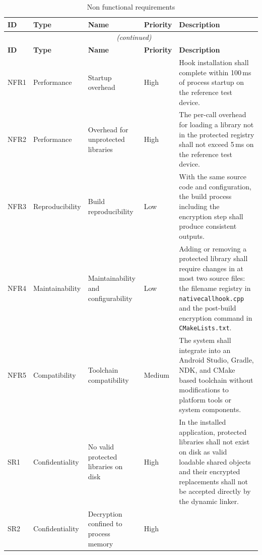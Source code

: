 \documentclass[11pt,a4paper]{report}
\renewcommand\_{{\textunderscore\allowbreak}}
\begin{document}
{%
\begin{longtable}{|p{}|p{}|p{}|p{}|p{}|}
    \caption{Non functional requirements} \label{tab:nonfunctional_requirements} \\
    \hline
    \textbf{ID} & \textbf{Type} & \textbf{Name} & \textbf{Priority} & \textbf{Description} \\
    \hline
    \endfirsthead
    \multicolumn{5}{c}{\tablename\ \thetable{} \textit{(continued)}} \\[0.5ex]
    \hline
    \textbf{ID} & \textbf{Type} & \textbf{Name} & \textbf{Priority} & \textbf{Description} \\
    \hline
    \endhead
    \endfoot
    \endlastfoot
        NFR1 & Performance &
        Startup overhead & High &
        Hook installation shall complete within 100\,ms of process startup on the reference test device. \\
        \hline
        NFR2 & Performance &
        Overhead for unprotected libraries & High &
        The per-call overhead for loading a library not in the protected registry shall not exceed 5\,ms on the reference test device. \\
        \hline
        NFR3 & Reproducibility &
        Build reproducibility & Low &
        With the same source code and configuration, the build process including the encryption step shall produce consistent outputs. \\
        \hline
        NFR4 & Maintainability &
        Maintainability and configurability & Low &
        Adding or removing a protected library shall require changes in at most two source files: the filename registry in \texttt{nativecallhook.cpp} and the post-build encryption command in \texttt{CMakeLists.txt}. \\
        \hline
        NFR5 & Compatibility &
        Toolchain compatibility & Medium &
        The system shall integrate into an Android Studio, Gradle, NDK, and CMake based toolchain without modifications to platform tools or system components. \\
        \hline
        SR1 & Confidentiality &
        No valid protected libraries on disk & High &
        In the installed application, protected libraries shall not exist on disk as valid loadable shared objects and their encrypted replacements shall not be accepted directly by the dynamic linker. \\
        \hline
        SR2 & Confidentiality &
        Decryption confined to process memory & High &

\end{longtable}}
\end{document}
